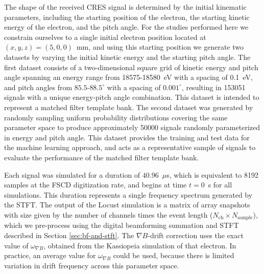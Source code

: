 The shape of the received CRES signal is determined by the initial kinematic parameters, including the starting position of the electron, the starting kinetic energy of the electron, and the pitch angle. For the studies performed here we constrain ourselves to a single initial electron position located at $(x,y,z)=(5, 0, 0)$~mm, and using this starting position we generate two datasets by varying the initial kinetic energy and the starting pitch angle. The first dataset consists of a two-dimensional square grid of kinetic energy and pitch angle spanning an energy range from 18575-18580~eV with a spacing of 0.1~eV, and pitch angles from $85.5$-$88.5^\circ$ with a spacing of $0.001^\circ$, resulting in 153051 signals with a unique energy-pitch angle combination. This dataset is intended to represent a matched filter template bank. The second dataset was generated by randomly sampling uniform probability distributions covering the same parameter space to produce approximately 50000 signals randomly parameterized in energy and pitch angle. This dataset provides the training and test data for the machine learning approach, and acts as a representative sample of signals to evaluate the performance of the matched filter template bank.

Each signal was simulated for a duration of $40.96$~$\mu$s, which is equivalent to 8192 samples at the FSCD digitization rate, and begins at time $t=0$~s for all simulations. This duration represents a single frequency spectrum generated by the STFT. The output of the Locust simulation is a matrix of array snapshots with size given by the number of channels times the event length ($N_\textrm{ch}\times N_\textrm{sample}$), which we pre-process using the digital beamforming summation and STFT described in Section \ref{sec:bf-and-stft}. The $\nabla B$-drift correction uses the exact value of $\omega_{\nabla B}$, obtained from the Kassiopeia simulation of that electron. In practice, an average value for $\omega_{\nabla B}$ could be used, because there is limited variation in drift frequency across this parameter space.

